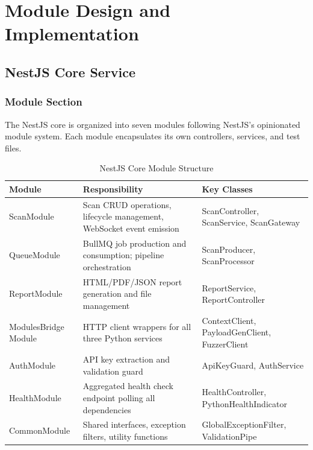\section{Module Design and Implementation}
\subsection{NestJS Core Service}
\subsubsection{Module Section}
The NestJS core is organized into seven modules following NestJS's opinionated module system.
Each module encapsulates its own controllers, services, and test files.
   \begin{table}[H]
    \centering
    \begin{tabular}{|p{2.7cm}|p{5cm}|p{4cm}|}
    \hline
    \textbf{Module} &
    \textbf{Responsibility} &
    \textbf{Key Classes} \\
    \hline
    
    ScanModule &
    Scan CRUD operations, lifecycle management, WebSocket event emission &
    ScanController, ScanService, ScanGateway \\
    \hline
    
    QueueModule &
    BullMQ job production and consumption; pipeline orchestration &
    ScanProducer, ScanProcessor \\
    \hline
    
    ReportModule &
    HTML/PDF/JSON report generation and file management &
    ReportService, ReportController \\
    \hline
    
    ModulesBridge Module &
    HTTP client wrappers for all three Python services &
    ContextClient, PayloadGenClient, FuzzerClient \\
    \hline
    
    AuthModule &
    API key extraction and validation guard &
    ApiKeyGuard, AuthService \\
    \hline
    
    HealthModule &
    Aggregated health check endpoint polling all dependencies &
    HealthController, PythonHealthIndicator \\
    \hline
    
    CommonModule &
    Shared interfaces, exception filters, utility functions &
    GlobalExceptionFilter, ValidationPipe \\
    \hline
    \end{tabular}
    \caption{NestJS Core Module Structure}
    \end{table}
